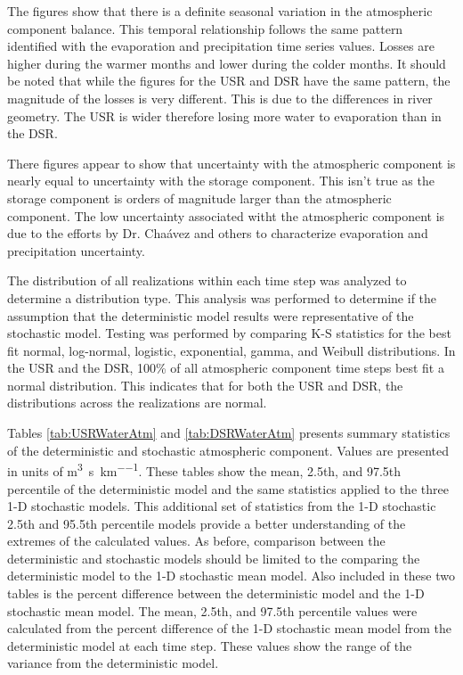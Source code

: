 \begin{linenumbers}
The figures show that there is a definite seasonal variation in the atmospheric component balance.  This temporal relationship follows the same pattern identified with the evaporation and precipitation time series values.  Losses are higher during the warmer months and lower during the colder months.  It should be noted that while the figures for the USR and DSR have the same pattern, the magnitude of the losses is very different.  This is due to the differences in river geometry.  The USR is wider therefore losing more water to evaporation than in the DSR.

There figures appear to show that uncertainty with the atmospheric component is nearly equal to uncertainty with the storage component.  This isn't true as the storage component is orders of magnitude larger than the atmospheric component.  The low uncertainty associated witht the atmospheric component is due to the efforts by Dr. Cha\'{a}vez and others to characterize evaporation and precipitation uncertainty.

The distribution of all realizations within each time step was analyzed to determine a distribution type.  This analysis was performed to determine if the assumption that the deterministic model results were representative of the stochastic model.  Testing was performed by comparing K-S statistics for the best fit normal, log-normal, logistic, exponential, gamma, and Weibull distributions.  In the USR and the DSR, 100\% of all atmospheric component time steps best fit a normal distribution. This indicates that for both the USR and DSR, the distributions across the realizations are normal. 

Tables \ref{tab:USRWaterAtm} and \ref{tab:DSRWaterAtm} presents summary statistics of the deterministic and stochastic atmospheric component.  Values are presented in units of \si{\cubic\meter\per\second\per\kilo\meter}.   These tables show the mean, 2.5th, and 97.5th percentile of the deterministic model and the same statistics applied to the three 1-D stochastic models.  This additional set of statistics from the 1-D stochastic 2.5th and 95.5th percentile models provide a better understanding of the extremes of the calculated values.  As before, comparison between the deterministic and stochastic models should be limited to the comparing the deterministic model to the 1-D stochastic mean model.  Also included in these two tables is the percent difference between the deterministic model and the 1-D stochastic mean model.  The mean, 2.5th, and 97.5th percentile values were calculated from the percent difference of the 1-D stochastic mean model from the deterministic model at each time step.  These values show the range of the variance from the deterministic model.


\end{linenumbers}
